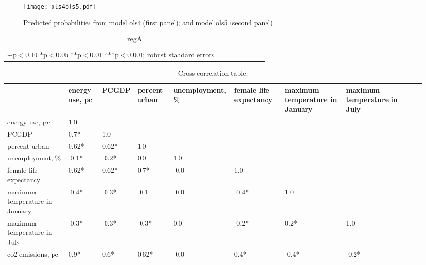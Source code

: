 \documentclass[10pt, letterpaper]{article}
\begin{document}
\begin{spacing}{1.0}
\begin{figure}[H]
 \texttt{[image: ols4ols5.pdf]}\centering
\caption{Predicted probabilities from model  ols4 (first panel); and model ols5
  (second panel)%
}\label{ols4ols5}
\end{figure}


\begin{table}[H]\centering \caption{regA} \label{regA} \begin{scriptsize} \begin{tabular}{p{1.4in}p{.43in}p{.43in}p{.43in}p{.43in}p{.43in}p{.43in}p{.43in}p{.43in}p{.43in}p{.43 in}p{.43in}p{.43 in}}\hline  \hline\multicolumn{6}{l}{+p$<$0.10 *p$<$0.05 **p$<$0.01 ***p$<$0.001; robust standard errors} \end{tabular}\end{scriptsize}\end{table}

\begin{table}[h!]
  \centering\begin{scriptsize}
  \begin{tabular}{lp{.62in}p{.62in}p{.62in}p{.62in}p{.62in}p{.62in}p{.62in}p{.62in}p{.62in}p{.62in}}
             &   energy use, pc &  PCGDP &  percent urban &  unemployment, \% &  female life expectancy & maximum temperature in January& maximum temperature in July&\\\hline
         energy use, pc &   1.0 &      &      &     &       &       &       &\\
         PCGDP &   0.7*&  1.0 &      &     &       &       &       &\\
         percent urban &   0.62*&  0.62*&  1.0 &     &       &       &       &\\
          unemployment, \% &  -0.1*& -0.2*&  0.0 &  1.0&       &       &       &\\
        female life expectancy &   0.62*&  0.62*&  0.7*& -0.0&   1.0 &       &       &\\
      maximum temperature in January &  -0.4*& -0.3*& -0.1 & -0.0&  -0.4*&  1.0  &       &\\
      maximum temperature in July &  -0.3*& -0.3*& -0.3*&  0.0&  -0.2*&  0.2* & 1.0   &\\ 
         co2 emissions, pc &   0.9*&  0.6*&  0.62*& -0.0&   0.4*& -0.4* &-0.2*  &\\
  \end{tabular}\end{scriptsize}
  \caption{Cross-correlation table.}
  \label{ccTab}
\end{table}



\end{spacing}
\end{document}
